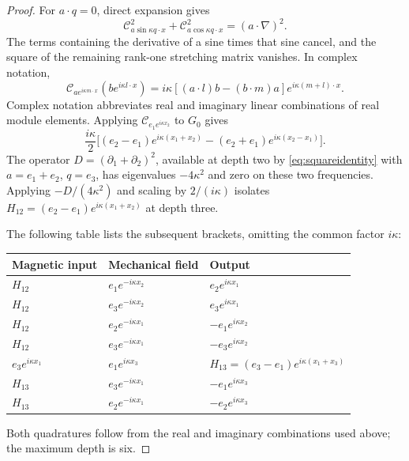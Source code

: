 \documentclass[11pt,a4paper]{amsart}
\theoremstyle{definition}
\theoremstyle{remark}
\numberwithin{equation}{section}
\newcommand{\Ccal}{\mathcal C}
\begin{document}
\begin{proof}
For $a\cdot q=0$, direct expansion gives
\begin{equation}\label{eq:squareidentity}
 \Ccal_{a\sin\kappa q\cdot x}^2+
 \Ccal_{a\cos\kappa q\cdot x}^2=(a\cdot\nabla)^2.
\end{equation}
The terms containing the derivative of a sine times that sine cancel, and the square of the remaining rank-one stretching matrix vanishes.
In complex notation,
\begin{equation}\label{eq:complexbracket}
 \Ccal_{a e^{i\kappa m\cdot x}}(b e^{i\kappa l\cdot x})
 =i\kappa[(a\cdot l)b-(b\cdot m)a]e^{i\kappa(m+l)\cdot x}.
\end{equation}
Complex notation abbreviates real and imaginary linear combinations of real module elements.
Applying $\Ccal_{e_1e^{i\kappa x_2}}$ to $G_0$ gives
\[
 \frac{i\kappa}{2}\big[(e_2-e_1)e^{i\kappa(x_1+x_2)}
 -(e_2+e_1)e^{i\kappa(x_2-x_1)}\big].
\]
The operator $D=(\partial_1+\partial_2)^2$, available at depth two by \eqref{eq:squareidentity} with $a=e_1+e_2$, $q=e_3$, has eigenvalues $-4\kappa^2$ and zero on these two frequencies. Applying $-D/(4\kappa^2)$ and scaling by $2/(i\kappa)$ isolates
$H_{12}=(e_2-e_1)e^{i\kappa(x_1+x_2)}$ at depth three.

The following table lists the subsequent brackets, omitting the common factor $i\kappa$:
\begin{center}\small
\begin{tabular}{lll}
\toprule
Magnetic input & Mechanical field & Output\\
\midrule
$H_{12}$ & $e_1e^{-i\kappa x_2}$ & $e_2e^{i\kappa x_1}$\\
$H_{12}$ & $e_3e^{-i\kappa x_2}$ & $e_3e^{i\kappa x_1}$\\
$H_{12}$ & $e_2e^{-i\kappa x_1}$ & $-e_1e^{i\kappa x_2}$\\
$H_{12}$ & $e_3e^{-i\kappa x_1}$ & $-e_3e^{i\kappa x_2}$\\
$e_3e^{i\kappa x_1}$ & $e_1e^{i\kappa x_3}$ & $H_{13}=(e_3-e_1)e^{i\kappa(x_1+x_3)}$\\
$H_{13}$ & $e_3e^{-i\kappa x_1}$ & $-e_1e^{i\kappa x_3}$\\
$H_{13}$ & $e_2e^{-i\kappa x_1}$ & $-e_2e^{i\kappa x_3}$\\
\bottomrule
\end{tabular}
\end{center}
Both quadratures follow from the real and imaginary combinations used above; the maximum depth is six.


\end{proof}
\end{document}
